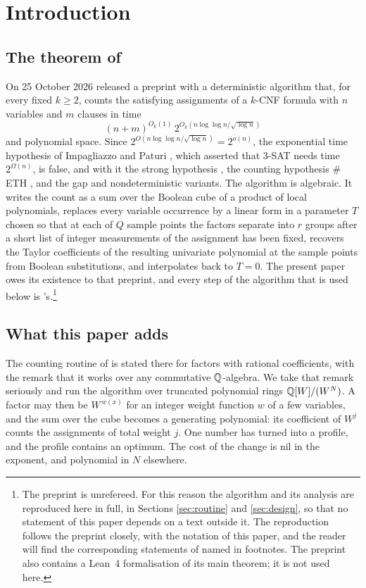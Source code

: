 \section{Introduction}\label{sec:intro}

\subsection{The theorem of \oai{}}
On 25 October 2026 \oai{} released a preprint \cite{OAI26} with a deterministic
algorithm that, for every fixed $k\ge 2$, counts the satisfying assignments of a
$k$-CNF formula with $n$ variables and $m$ clauses in time
\begin{equation}\label{eq:oaitime}
  (n+m)^{O_k(1)}\, 2^{O_k(n\log\log n/\sqrt{\log n})}
\end{equation}
and polynomial space. Since $2^{O(n\log\log n/\sqrt{\log n})}=2^{o(n)}$, the
exponential time hypothesis of Impagliazzo and Paturi \cite{IP01}, which asserted
that $3$-SAT needs time $2^{\Omega(n)}$, is false, and with it the strong
hypothesis \cite{IPZ01}, the counting hypothesis $\#$ETH \cite{DHMTW14}, and the
gap and nondeterministic variants. The algorithm is algebraic. It writes the
count as a sum over the Boolean cube of a product of local polynomials, replaces
every variable occurrence by a linear form in a parameter $T$ chosen so that at
each of $Q$ sample points the factors separate into $r$ groups after a short
list of integer measurements of the assignment has been fixed, recovers the
Taylor coefficients of the resulting univariate polynomial at the sample points
from Boolean substitutions, and interpolates back to $T=0$. The present paper
owes its existence to that preprint, and every step of the algorithm that is used
below is \oai{}'s.\footnote{The preprint is unrefereed. For this reason the
algorithm and its analysis are reproduced here in full, in Sections
\ref{sec:routine} and \ref{sec:design}, so that no statement of this paper
depends on a text outside it. The reproduction follows the preprint closely, with
the notation of this paper, and the reader will find the corresponding statements
of \cite{OAI26} named in footnotes. The preprint also contains a Lean~4
formalisation of its main theorem; it is not used here.}

\subsection{What this paper adds}
The counting routine of \cite{OAI26} is stated there for factors with rational
coefficients, with the remark that it works over any commutative $\mathbb{Q}$-algebra.
We take that remark seriously and run the algorithm over truncated polynomial
rings $\mathbb{Q}[W]/(W^{N})$. A factor may then be $W^{\,w(x)}$ for an integer weight
function $w$ of a few variables, and the sum over the cube becomes a generating
polynomial: its coefficient of $W^{j}$ counts the assignments of total weight
$j$. One number has turned into a profile, and the profile contains an optimum.
The cost of the change is nil in the exponent, and polynomial in $N$ elsewhere.


